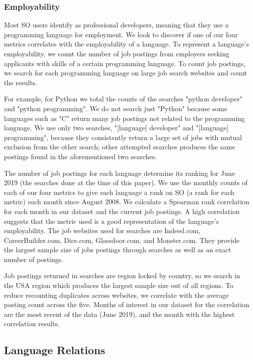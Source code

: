 \documentclass[conference]{IEEEtran}
\begin{document}
\subsubsection{Employability}

Most SO users identify as professional developers, meaning that they use a programming language for employment. We look to discover if one of our four metrics correlates with the employability of a language. To represent a language's employability, we count the number of job postings from employers seeking applicants with skills of a certain programming language. To count job postings, we search for each programming language on large job search websites and count the results. 

For example, for Python we total the counts of the searches "python developer" and "python programming". We do not search just "Python" because some languages such as "C" return many job postings not related to the programming language. We use only two searches, "[language] developer" and "[language] programming", because they consistently return a large set of jobs with mutual exclusion from the other search; other attempted searches produces the same postings found in the aforementioned two searches. 

The number of job postings for each language determine its ranking for June 2019 (the searches done at the time of this paper). We use the monthly counts of each of our four metrics to give each language a rank on SO (a rank for each metric) each month since August 2008. We calculate a Spearman rank correlation for each month in our dataset and the current job postings. A high correlation suggests that the metric used is a good representation of the language's employability. The job websites used for searches are Indeed.com, CareerBuilder.com, Dice.com, Glassdoor.com, and Monster.com. They provide the largest sample size of jobs postings through searches as well as an exact number of postings.
    
Job postings returned in searches are region locked by country, so we search in the USA region which produces the largest sample size out of all regions. To reduce recounting duplicates across websites, we correlate with the average posting count across the five. Months of interest in our dataset for the correlation are the most recent of the data (June 2019), and the month with the highest correlation results.


\subsection{Language Relations}
\end{document}
